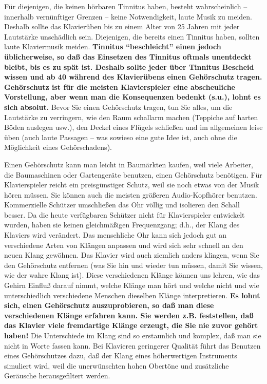 Für diejenigen, die keinen hörbaren Tinnitus haben, besteht wahrscheinlich -- innerhalb vernünftiger Grenzen -- keine Notwendigkeit, laute Musik zu meiden.
Deshalb sollte das Klavierüben bis zu einem Alter von 25 Jahren mit jeder Lautstärke unschädlich sein.
Diejenigen, die bereits einen Tinnitus haben, sollten laute Klaviermusik meiden.
\textbf{Tinnitus \enquote{beschleicht} einen jedoch üblicherweise, so daß das Einsetzen des Tinnitus oftmals unentdeckt bleibt, bis es zu spät ist.
Deshalb sollte jeder über Tinnitus Bescheid wissen und ab 40 während des Klavierübens einen Gehörschutz tragen.
Gehörschutz ist für die meisten Klavierspieler eine abscheuliche Vorstellung, aber wenn man die Konsequenzen bedenkt (s.u.), lohnt es sich absolut.}
Bevor Sie einen Gehörschutz tragen, tun Sie alles, um die Lautstärke zu verringern, wie den Raum schallarm machen (Teppiche auf harten Böden auslegen usw.), den Deckel eines Flügels schließen und im allgemeinen leise üben (auch laute Passagen -- was sowieso eine gute Idee ist, auch ohne die Möglichkeit eines Gehörschadens).

Einen Gehörschutz kann man leicht in Baumärkten kaufen, weil viele Arbeiter, die Baumaschinen oder Gartengeräte benutzen, einen Gehörschutz benötigen.
Für Klavierspieler reicht ein preisgünstiger Schutz, weil sie noch etwas von der Musik hören müssen.
Sie können auch die meisten größeren Audio-Kopfhörer benutzen.
Kommerzielle Schützer umschließen das Ohr völlig und isolieren den Schall besser.
Da die heute verfügbaren Schützer nicht für Klavierspieler entwickelt wurden, haben sie keinen gleichmäßigen Frequenzgang; d.h., der Klang des Klaviers wird verändert.
Das menschliche Ohr kann sich jedoch gut an verschiedene Arten von Klängen anpassen und wird sich sehr schnell an den neuen Klang gewöhnen.
Das Klavier wird auch ziemlich anders klingen, wenn Sie den Gehörschutz entfernen (was Sie hin und wieder tun müssen, damit Sie wissen, wie der wahre Klang ist).
Diese verschiedenen Klänge können uns lehren, wie das Gehirn Einfluß darauf nimmt, welche Klänge man hört und welche nicht und wie unterschiedlich verschiedene Menschen dieselben Klänge interpretieren.
\textbf{Es lohnt sich, einen Gehörschutz auszuprobieren, so daß man diese verschiedenen Klänge erfahren kann.
Sie werden z.B. feststellen, daß das Klavier viele fremdartige Klänge erzeugt, die Sie nie zuvor gehört haben!}
Die Unterschiede im Klang sind so erstaunlich und komplex, daß man sie nicht in Worte fassen kann.
Bei Klavieren geringerer Qualität führt das Benutzen eines Gehörschutzes dazu, daß der Klang eines höherwertigen Instruments simuliert wird, weil die unerwünschten hohen Obertöne und zusätzliche Geräusche herausgefiltert werden.

